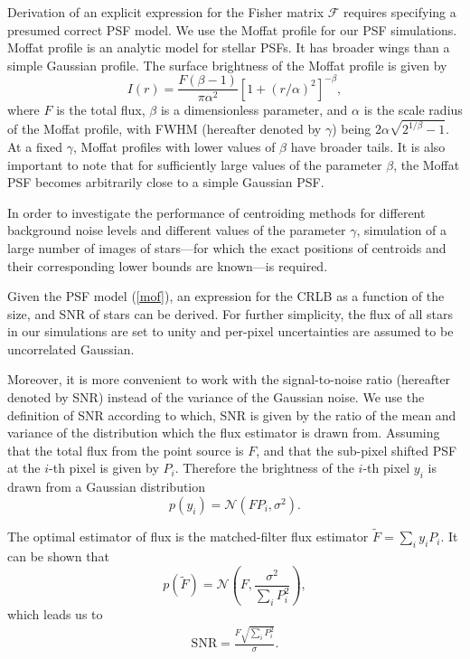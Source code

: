 \documentclass[12pt, preprint]{aastex}
\newcommand{\beq}{\begin{equation}}
\newcommand{\eeq}{\end{equation}}
\begin{document}
Derivation of an explicit expression for the Fisher matrix $\mathcal{F}$ requires specifying a presumed correct 
PSF model.
We use the Moffat profile \citep{moffat} for our PSF simulations. 
Moffat profile is an analytic model for stellar PSFs. It has broader wings than
a simple Gaussian profile. The surface brightness of the Moffat profile is given by
\beq
I(r) = \frac{F(\beta -1)}{\pi \alpha^{2}}[1+(r/\alpha)^{2}]^{-\beta},
\label{mof}
\eeq
where $F$ is the total flux, $\beta$ is a dimensionless parameter, and $\alpha$ is
the scale radius of the Moffat profile, with FWHM (hereafter denoted by $\gamma$)
being $2\alpha\sqrt{2^{1/\beta}-1}$. At a fixed $\gamma$, Moffat profiles with lower values
of $\beta$ have broader tails. It is also important to note that for sufficiently large values of the 
parameter $\beta$, the Moffat PSF becomes arbitrarily close to a simple Gaussian PSF. 
 
In order to investigate the performance of centroiding methods for
 different background noise levels and different
values of the parameter $\gamma$, simulation of a large number of images of stars---for which the exact positions of centroids
and their corresponding lower bounds are known---is required.

Given the PSF model (\ref{mof}), an expression for the CRLB as a function of the size, and SNR of stars can be 
derived. For further simplicity, the flux of all stars in our simulations are set to unity and per-pixel 
uncertainties are assumed to be uncorrelated Gaussian.

Moreover, it is more convenient to work with the signal-to-noise ratio
(hereafter denoted by SNR) instead of the variance of the Gaussian noise.
We use the definition of SNR according to which, SNR is given by the ratio
 of the mean and variance of the distribution
which the flux estimator is drawn from. Assuming that the total flux from
the point source is $F$, and that the sub-pixel shifted PSF at the $i$-th pixel is given
by $P_{i}$. Therefore the brightness of the $i$-th pixel $y_{i}$ is drawn from
a Gaussian distribution 
\beq
p(y_{i}) = \mathcal{N}(FP_{i},\sigma^{2}). 
\eeq

The optimal estimator of flux is the matched-filter flux estimator 
$\tilde{F}=\sum_{i}y_{i}P_{i}$. It can be shown that 
\beq
p(\tilde{F}) = \mathcal{N}(F , \frac{\sigma^{2}}{\sum_{i}P_{i}^{2}}),
\eeq  
which leads us to
\beq
\begin{array}{l}
\text{SNR} = \frac{F\sqrt{\sum_{i} P_{i}^{2}}}{\sigma}.
\end{array}
\label{snr}
\eeq
\end{document}
